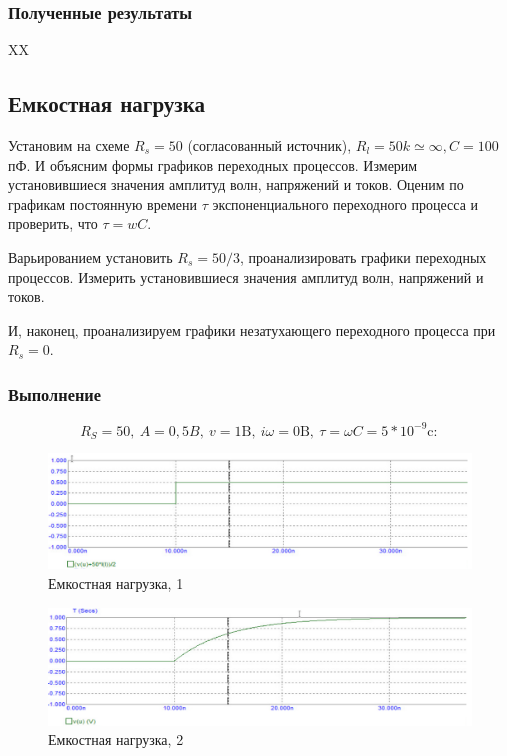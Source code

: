 \documentclass[a4paper, 14pt]{extarticle}%
\begin{document}
\subsubsection{Полученные результаты}

XX

\subsection{Емкостная нагрузка}

Установим на схеме $R_{s}=50$ (согласованный источник), $R_{l}=50 k \simeq \infty, C=100$ пФ. И объясним формы графиков переходных процессов. Измерим установившиеся значения амплитуд волн, напряжений и токов. Оценим по графикам постоянную времени $\tau$ экспоненциального переходного процесса и проверить, что $\tau=w C$.

Варьированием установить $R_{s}=50 / 3$, проанализировать графики переходных процессов. Измерить установившиеся значения амплитуд волн, напряжений и токов.

И, наконец, проанализируем графики незатухающего переходного процесса при $R_{s}=0 .$

\subsubsection{Выполнение}

\[ R_{S}=50,\ A=0,5 B,\ v=1 \text{B},\  i \omega=0 \text{B},\ \tau=\omega C = 5 * 10^{-9} \text{c}:\]

\newpage

\begin{figure}[h!]
			\centering
			\includegraphics[width=1.1\linewidth]{./graphs/20.jpg}
			\caption{Емкостная нагрузка, 1}
			\label{5.1}
\end{figure}

\begin{figure}[h!]
			\centering
			\includegraphics[width=1.1\linewidth]{./graphs/21.jpg}
			\caption{Емкостная нагрузка, 2}
			\label{5.2}
\end{figure}
\end{document}
